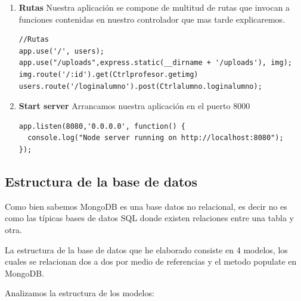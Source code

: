 \begin{enumerate}
    \item \textbf{Rutas} Nuestra aplicación se compone de multitud de rutas que invocan a funciones contenidas en nuestro controlador que mas tarde explicaremos.
\begin{lstlisting}
//Rutas
app.use('/', users);
app.use("/uploads",express.static(__dirname + '/uploads'), img);
img.route('/:id').get(Ctrlprofesor.getimg)
users.route('/loginalumno').post(Ctrlalumno.loginalumno);
\end{lstlisting}
    \item \textbf{Start server} Arrancamos nuestra aplicación en el puerto 8000
\begin{lstlisting}
app.listen(8080,'0.0.0.0', function() {
  console.log("Node server running on http://localhost:8080");
});
\end{lstlisting}
\end{enumerate}

\subsection{Estructura de la base de datos} 
Como bien sabemos MongoDB es una base datos no relacional, es decir no es como las típicas bases de datos SQL donde existen relaciones entre una tabla y otra. 

La estructura de la base de datos que he elaborado consiste en 4 modelos, los cuales se relacionan dos a dos por medio de referencias y el metodo populate en MongoDB.

Analizamos la estructura de los modelos:

